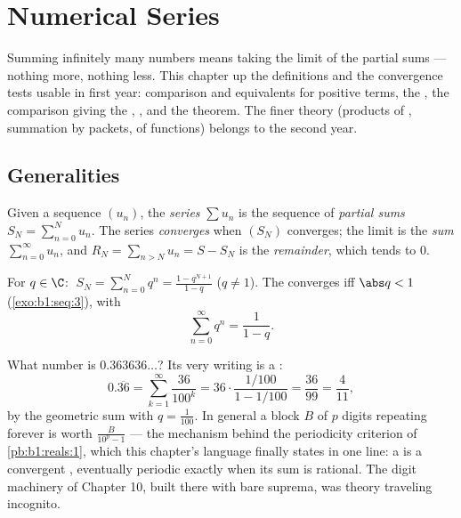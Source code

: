 \chapter{Numerical Series}\label{ch:b1:series}

Summing infinitely many numbers means taking the limit of the partial
sums --- nothing more, nothing less. This chapter  up the
definitions and the convergence tests usable in first year:
comparison and equivalents for positive terms, the , the
 comparison giving the , ,
and the  theorem. The finer theory (products of
, summation by packets,  of functions) belongs to the
second year.

\section{Generalities}

\begin{definition}\label{def:b1:series:def}
Given a sequence $(u_n)$, the \emph{series} $\sum u_n$
is the sequence of \emph{partial sums} $S_N = \sum_{n=0}^{N} u_n$.
The series \emph{converges} when $(S_N)$ converges; the limit is the
\emph{sum} $\sum_{n=0}^{\infty} u_n$, and $R_N = \sum_{n > N} u_n =
S - S_N$ is the \emph{remainder}, which tends to $0$.
\end{definition}

\begin{example}\label{ex:b1:series:geometric}
For $q \in \C$: $\;S_N = \sum_{n=0}^{N} q^n = \frac{1 -
q^{N+1}}{1-q}$ ($q \neq 1$). The  converges iff $\abs q < 1$
(\cref{exo:b1:seq:3}), with
\[
\sum_{n=0}^{\infty} q^n = \frac{1}{1 - q} .
\]
\end{example}

\begin{example}\label{ex:b1:series:periodicdecimal}
What number is $0.363636\dots$? Its very writing is a :
\[
0.\overline{36} = \sum_{k=1}^{\infty} \frac{36}{100^k}
= 36\cdot\frac{1/100}{1 - 1/100} = \frac{36}{99} =
\frac{4}{11} ,
\]
by the geometric sum with $q = \frac{1}{100}$. In general a
block $B$ of $p$ digits repeating forever is worth
$\frac{B}{10^p - 1}$ --- the mechanism behind the periodicity
criterion of \cref{pb:b1:reals:1}, which this chapter's language
finally states in one line: a  is a convergent
, eventually periodic exactly when its sum is rational.
The digit machinery of Chapter 10, built there with bare
suprema, was  theory traveling incognito.
\end{example}

